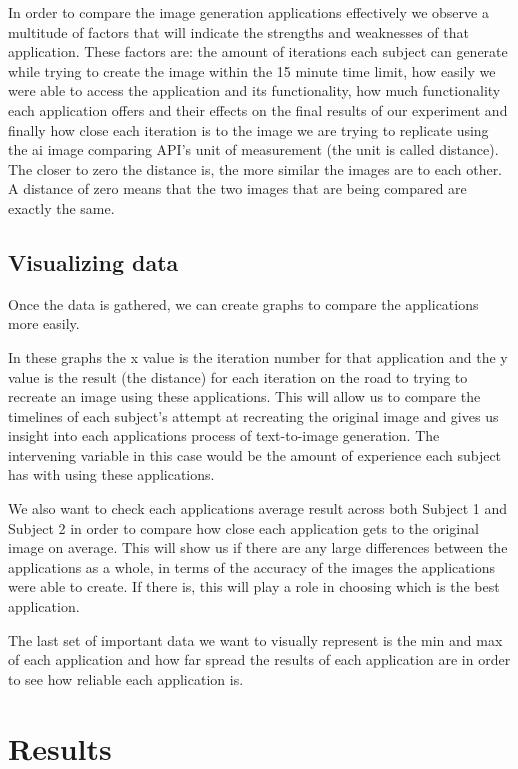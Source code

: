 \documentclass[]{report}
\begin{document}
	In order to compare the image generation applications effectively we observe a multitude of factors that will indicate the strengths and weaknesses of that application. These factors are: the amount of iterations each subject can generate while trying to create the image within the 15 minute time limit, how easily we were able to access the application and its functionality, how much functionality each application offers and their effects on the final results of our experiment and finally how close each iteration is to the image we are trying to replicate using the ai image comparing API's unit of measurement (the unit is called distance). The closer to zero the distance is, the more similar the images are to each other. A distance of zero means that the two images that are being compared are exactly the same.
	
	
	\subsection{Visualizing data}
	
	Once the data is gathered, we can create graphs to compare the applications more easily. 
	
	In these graphs the x value is the iteration number for that application and the y value is the result (the distance) for each iteration on the road to trying to recreate an image using these applications. This will allow us to compare the timelines of each subject's attempt at recreating the original image and gives us insight into each applications process of text-to-image generation. The intervening variable in this case would be the amount of experience each subject has with using these applications.
	
	We also want to check each applications average result across both Subject 1 and Subject 2 in order to compare how close each application gets to the original image on average. This will show us if there are any large differences between the applications as a whole, in terms of the accuracy of the images the applications were able to create. If there is, this will play a role in choosing which is the best application.
	
	The last set of important data we want to visually represent is the min and max of each application and how far spread the results of each application are in order to see how reliable each application is. 
	
	
	
	\pagebreak
	
	\section{Results}
	
\end{document}
